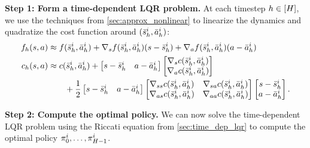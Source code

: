 \documentclass[\main/main]{subfiles}
\begin{document}
\textbf{Step 1: Form a time-dependent LQR problem.}
At each timestep $h \in [H]$, we use the techniques from \autoref{sec:approx_nonlinear} to linearize the dynamics and quadratize the cost function around $(\bar {s}^i_h, \bar {a}^i_h)$:
\begingroup
\newcommand{\iter}[1]{\bar {#1}^i_\hi}
\newcommand{\grad}[2]{\nabla_{#2} #1(\iter \st, \iter \act)}
\begin{align*}
    f_\hi(\st, \act) & \approx f(\iter \st, \iter \act) + \grad f \st (\st - \iter \st) + \grad f \act (\act - \iter \act)                         \\
    c_\hi(\st, \act) & \approx c(\iter \st, \iter \act) + \begin{bmatrix}
                                                              \st - \iter \st & \act - \iter \act
                                                          \end{bmatrix} \begin{bmatrix}
                                                                            \grad c \st \\
                                                                            \grad c \act
                                                                        \end{bmatrix}                                                      \\
                     & \qquad + \frac{1}{2} \begin{bmatrix}
                                                \st - \iter \st & \act - \iter \act
                                            \end{bmatrix} \begin{bmatrix}
                                                              \nabla_{\st \st} c(\iter \st, \iter \act)  & \nabla_{\st \act} c(\iter \st, \iter \act)  \\
                                                              \nabla_{\act \st} c(\iter \st, \iter \act) & \nabla_{\act \act} c(\iter \st, \iter \act)
                                                          \end{bmatrix}
    \begin{bmatrix}
        \st - \iter \st \\
        \act - \iter \act
    \end{bmatrix}.
\end{align*}
\endgroup

\textbf{Step 2: Compute the optimal policy.}
We can now solve the time-dependent LQR problem using the Riccati equation from \autoref{sec:time_dep_lqr} to compute the optimal policy $\pi^i_0, \dots, \pi^i_{H-1}$.
\end{document}
